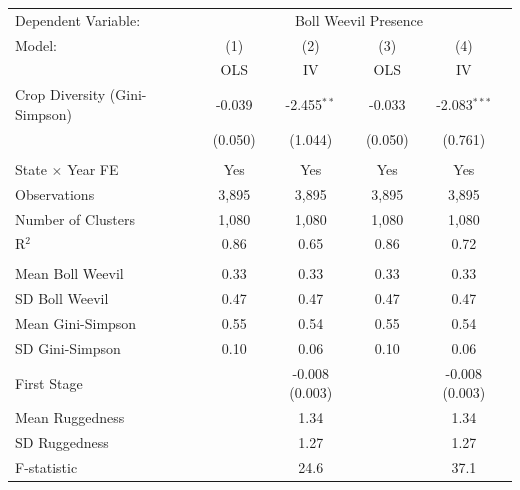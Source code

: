 \begingroup
\centering
\begin{tabular}{lcccc}
   \toprule \toprule
   Dependent Variable: & \multicolumn{4}{c}{Boll Weevil Presence} \\
   Model: & (1) & (2) & (3) & (4) \\
          & OLS  & IV & OLS & IV \\
   \midrule
  Crop Diversity (Gini-Simpson) & -0.039 & -2.455$^{**}$ & -0.033 & -2.083$^{***}$ \\
  & (0.050) & (1.044) & (0.050) & (0.761) \\
   & & & & \\
   State $\times$ Year FE        & Yes & Yes & Yes & Yes \\
   \midrule
  Observations & 3,895 & 3,895 & 3,895 & 3,895 \\
  Number of Clusters & 1,080 & 1,080 & 1,080 & 1,080 \\
  R$^2$ & 0.86 & 0.65 & 0.86 & 0.72 \\
   & & & & \\
  Mean Boll Weevil & 0.33 & 0.33 & 0.33 & 0.33 \\
  SD Boll Weevil & 0.47 & 0.47 & 0.47 & 0.47 \\
  Mean Gini-Simpson & 0.55 & 0.54 & 0.55 & 0.54 \\
  SD Gini-Simpson & 0.10 & 0.06 & 0.10 & 0.06 \\
   \midrule
  First Stage &  & -0.008 (0.003) &  & -0.008 (0.003) \\
  Mean Ruggedness &  & 1.34 &  & 1.34 \\
  SD Ruggedness &  & 1.27 &  & 1.27 \\
  F-statistic &  & 24.6 &  & 37.1 \\
   \bottomrule \bottomrule
\end{tabular}
\par\endgroup
